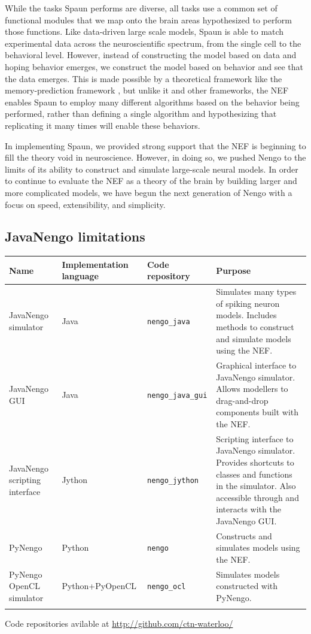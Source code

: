 \documentclass{frontiersSCNS}
\begin{document}
While the tasks Spaun performs are diverse,
all tasks use a common set of
functional modules that we map
onto the brain areas hypothesized
to perform those functions.
Like data-driven large scale models,
Spaun is able to match experimental data
across the neuroscientific spectrum,
from the single cell to the behavioral level.
However, instead of constructing the model
based on data and hoping behavior emerges,
we construct the model
based on behavior
and see that the data emerges.
This is made possible by a theoretical framework
like the memory-prediction framework \cite{TODO},
but unlike it and other frameworks,
the NEF enables Spaun to employ
many different algorithms
based on the behavior being performed,
rather than defining a single algorithm
and hypothesizing that replicating it
many times will enable these behaviors.

In implementing Spaun,
we provided strong support
that the NEF is beginning to fill the theory void in neuroscience.
However, in doing so, we pushed Nengo
to the limits of its ability to construct and simulate
large-scale neural models.
In order to continue to evaluate the NEF
as a theory of the brain
by building larger and more complicated models,
we have begun the next generation
of Nengo with a focus on speed,
extensibility, and simplicity.

\subsection{JavaNengo limitations}

\begin{table}[!t]
{\begin{tabular}{p{2.6cm} p{2.7cm} l p{7cm}} \toprule
\textbf{Name} & \textbf{Implementation language}
  & \textbf{Code repository} & \textbf{Purpose} \\\midrule
JavaNengo simulator & Java & \texttt{nengo\_java}
  & Simulates many types of spiking neuron models.
  Includes methods to construct and simulate models using the NEF. \\
JavaNengo GUI & Java & \texttt{nengo\_java\_gui}
  & Graphical interface to JavaNengo simulator.
  Allows modellers to drag-and-drop components built with the NEF. \\
JavaNengo scripting interface & Jython & \texttt{nengo\_jython}
  & Scripting interface to JavaNengo simulator.
  Provides shortcuts to classes and functions in the simulator.
  Also accessible through and interacts with the JavaNengo GUI. \\
PyNengo & Python & \texttt{nengo}
  & Constructs and simulates models using the NEF. \\
PyNengo OpenCL simulator & Python+PyOpenCL
  & \texttt{nengo\_ocl}
  & Simulates models constructed with PyNengo. \\\botrule
\end{tabular}}{Code repositories avilable at \url{http://github.com/ctn-waterloo/}}
\end{table}
\end{document}
